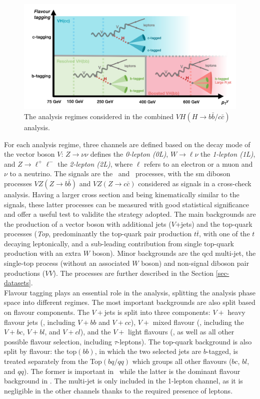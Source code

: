 \begin{figure}[h!]
\center
\includegraphics[width=\textwidth]{Images/VH/Cat/AnalysisRegime.png}
\caption{The analysis regimes considered in the combined $VH (H\rightarrow b\bar{b}/c\bar{c})$ analysis.} 
\label{fig:ana-strat}
\end{figure}

For each analysis regime, three channels are defined based on the decay mode of the vector boson $V$: $Z \rightarrow \nu \nu$ defines the \textit{0-lepton (0L)}, $W \rightarrow \ell \nu $ the \textit{1-lepton (1L)}, and $Z \rightarrow\ell^+\ell^-$ the \textit{2-lepton (2L)}, where $\ell$ refers to an electron or a muon and $\nu$ to a neutrino. The signals are the \vhb\ and \vhc\ processes, with the \gls{sm} diboson processes $VZ (Z\rightarrow b\bar{b})$ and $VZ (Z\rightarrow c\bar{c})$ considered as signals in a cross-check analysis. Having a larger cross section and being kinematically similar to the signals, these latter processes can be measured with good statistical significance and offer a useful test to validite the strategy adopted. The main backgrounds are the production of a vector boson with additional jets ($V$+jets) and the top-quark processes (\textit{Top}, predominantly the top-quark pair production $t\bar{t}$, with one of the $t$ decaying leptonically, and a sub-leading contribution from single top-quark production with an extra $W$ boson). Minor backgrounds are the \gls{qcd} multi-jet, the single-top process (without an associated $W$ boson) and non-signal diboson pair productions ($VV$). The processes are further described in the Section \ref{sec-datasets}. \\ 

Flavour tagging plays an essential role in the analysis, splitting the analysis phase space into different regimes. The most important backgrounds are also split based on flavour components. The $V+$jets is split into three components: $V+$ heavy flavour jets (\vhf, including $V+bb$ and $V+cc$), $V+$ mixed flavour (\vmf, including the $V+bc$, $V+bl$, and $V+cl$), and the $V+$ light flavours (\vlf, as well as all other possible flavour selection, including $\tau$-leptons). The top-quark background is also split by flavour: the top$(bb)$, in which the two selected jets are $b$-tagged, is treated separately from the Top$(bq/qq)$ which groups all other flavours ($bc$, $bl$, and $qq$). The former is important in \vhb\ while the latter is the dominant flavour background in \vhc. The multi-jet is only included in the 1-lepton channel, as it is negligible in the other channels thanks to the required presence of leptons. \\

